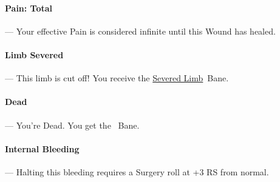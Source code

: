 \documentclass[oneside,11pt,english]{book}
\begin{document}
\vspace{-5pt}\paragraph[Total]{\label{par:Pain: Total}Pain: Total}---\quad
Your effective Pain is considered infinite until this Wound has healed.

\vspace{-5pt}\paragraph[Limb Severed!]{\label{par:Limb Severed}Limb Severed}---\quad
This limb is cut off! You receive the \hyperref[bane:Severed Limb/Appendage]{Severed Limb}~Bane. 

\vspace{-5pt}\paragraph{\label{par:Dead}Dead}---\quad
You’re Dead. You get the ~Bane.

\vspace{-5pt}\paragraph{\label{par:Internal Bleeding}Internal Bleeding}---\quad
Halting this bleeding requires a Surgery roll at +3 RS from normal.
\newpage
		\captionsetup{font=small} %
\end{document}
